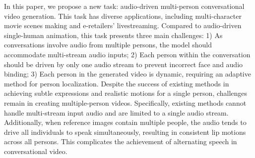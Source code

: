 \documentclass{article}
\begin{document}




In this paper, we propose a new task: audio-driven multi-person conversational video generation. This task has diverse applications, including multi-character movie scenes making and e-retailers' livestreaming. Compared to audio-driven single-human animation, this task presents three main challenges: 1) As conversations involve audio from multiple persons, the model should accommodate multi-stream audio inputs; 2) Each person within the conversation should be driven by only one audio stream to prevent incorrect face and audio binding; 3) Each person in the generated video is dynamic, requiring an adaptive method for person localization.
Despite the success of existing methods in achieving subtle expressions and realistic motions for a single person, challenges remain in creating multiple-person videos. Specifically, existing methods cannot handle multi-stream input audio and are limited to a single audio stream. Additionally, when reference images contain multiple people, the audio tends to drive all individuals to speak simultaneously, resulting in consistent lip motions across all persons. This complicates the achievement of alternating speech in conversational video.



\end{document}
